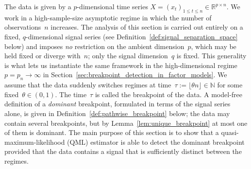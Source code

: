 \documentclass[10pt, letterpaper]{amsart}
\begin{document}
The data is given by a $p$-dimensional time series $X=(x_t)_{1\le t\le n}\in\mathbb R^{p\times n}$. We work in a high-sample-size asymptotic regime in which the number of observations~$n$ increases. The analysis of this section is carried out entirely on a fixed, $q$-dimensional signal series (see Definition~\ref{def:signal_separation_space} below) and imposes \emph{no} restriction on the ambient dimension~$p$, which may be held fixed or diverge with~$n$; only the signal dimension~$q$ is fixed. This generality is what lets us instantiate the same framework in the high-dimensional regime~$p=p_n\to\infty$ in Section~\ref{sec:breakpoint_detection_in_factor_models}. We assume that the data suddenly switches regimes at time~$\tau:= \lfloor \theta n \rfloor \in \mathbb{N}$ for some fixed~$\theta \in (0,1)$. The time~$\tau$ is called the breakpoint of the data.  A model-free definition of a \emph{dominant} breakpoint, formulated in terms of the signal series alone, is given in Definition~\ref{def:pathwise_breakpoint} below; the data may contain several breakpoints, but by Lemma~\ref{lem:unique_breakpoint} at most one of them is dominant. The main purpose of this section is to show that a quasi-maximum-likelihood (QML) estimator is able to detect  the dominant breakpoint provided that the data contains a signal that is sufficiently distinct between the regimes.\\
\end{document}
